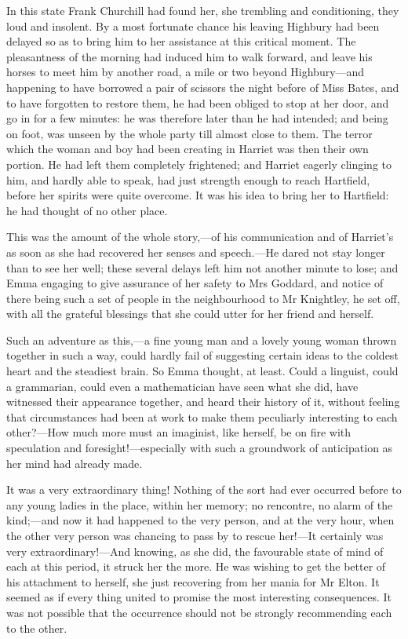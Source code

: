 In this state Frank Churchill had found her, she trembling and conditioning, they loud and insolent. By a most fortunate chance his leaving Highbury had been delayed so as to bring him to her assistance at this critical moment. The pleasantness of the morning had induced him to walk forward, and leave his horses to meet him by another road, a mile or two beyond Highbury—and happening to have borrowed a pair of scissors the night before of Miss Bates, and to have forgotten to restore them, he had been obliged to stop at her door, and go in for a few minutes: he was therefore later than he had intended; and being on foot, was unseen by the whole party till almost close to them. The terror which the woman and boy had been creating in Harriet was then their own portion. He had left them completely frightened; and Harriet eagerly clinging to him, and hardly able to speak, had just strength enough to reach Hartfield, before her spirits were quite overcome. It was his idea to bring her to Hartfield: he had thought of no other place.

This was the amount of the whole story,—of his communication and of Harriet's as soon as she had recovered her senses and speech.—He dared not stay longer than to see her well; these several delays left him not another minute to lose; and Emma engaging to give assurance of her safety to Mrs Goddard, and notice of there being such a set of people in the neighbourhood to Mr Knightley, he set off, with all the grateful blessings that she could utter for her friend and herself.

Such an adventure as this,—a fine young man and a lovely young woman thrown together in such a way, could hardly fail of suggesting certain ideas to the coldest heart and the steadiest brain. So Emma thought, at least. Could a linguist, could a grammarian, could even a mathematician have seen what she did, have witnessed their appearance together, and heard their history of it, without feeling that circumstances had been at work to make them peculiarly interesting to each other?—How much more must an imaginist, like herself, be on fire with speculation and foresight!—especially with such a groundwork of anticipation as her mind had already made.

It was a very extraordinary thing! Nothing of the sort had ever occurred before to any young ladies in the place, within her memory; no rencontre, no alarm of the kind;—and now it had happened to the very person, and at the very hour, when the other very person was chancing to pass by to rescue her!—It certainly was very extraordinary!—And knowing, as she did, the favourable state of mind of each at this period, it struck her the more. He was wishing to get the better of his attachment to herself, she just recovering from her mania for Mr Elton. It seemed as if every thing united to promise the most interesting consequences. It was not possible that the occurrence should not be strongly recommending each to the other.

